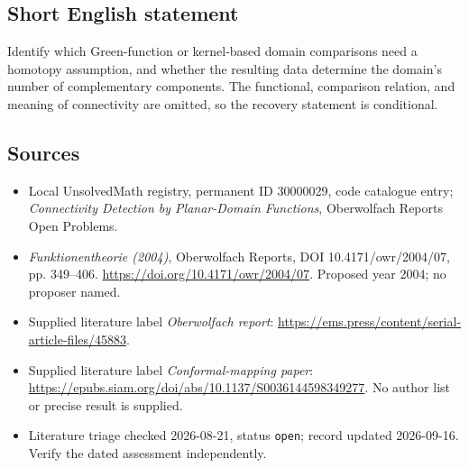 \documentclass[11pt]{article}
\begin{document}
\subsection{Short English statement}
Identify which Green-function or kernel-based domain comparisons need a homotopy assumption, and whether the resulting data determine the domain's number of complementary components. The functional, comparison relation, and meaning of connectivity are omitted, so the recovery statement is conditional.
\subsection{Sources}
\begin{itemize}\item Local UnsolvedMath registry, permanent ID 30000029, code catalogue entry; \emph{Connectivity Detection by Planar-Domain Functions}, Oberwolfach Reports Open Problems.\item \emph{Funktionentheorie (2004)}, Oberwolfach Reports, DOI 10.4171/owr/2004/07, pp. 349--406. \url{https://doi.org/10.4171/owr/2004/07}. Proposed year 2004; no proposer named.\item Supplied literature label \emph{Oberwolfach report}: \url{https://ems.press/content/serial-article-files/45883}.\item Supplied literature label \emph{Conformal-mapping paper}: \url{https://epubs.siam.org/doi/abs/10.1137/S0036144598349277}. No author list or precise result is supplied.\item Literature triage checked 2026-08-21, status \texttt{open}; record updated 2026-09-16. Verify the dated assessment independently.\end{itemize}
\end{document}
